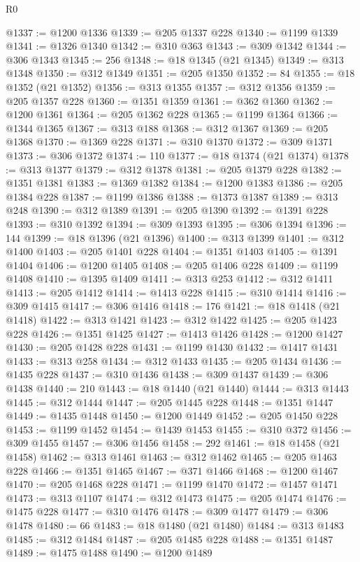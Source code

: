 \begin{lexlean}{R0}
\begin{coremodule}
@1337 := @1200 @1336
@1339 := @205 @1337 @228
@1340 := @1199 @1339
@1341 := @1326 @1340
@1342 := @310 @363
@1343 := @309 @1342
@1344 := @306 @1343
@1345 := 256
@1348 := @18 @1345 (@21 @1345)
@1349 := @313 @1348
@1350 := @312 @1349
@1351 := @205 @1350
@1352 := 84
@1355 := @18 @1352 (@21 @1352)
@1356 := @313 @1355
@1357 := @312 @1356
@1359 := @205 @1357 @228
@1360 := @1351 @1359
@1361 := @362 @1360
@1362 := @1200 @1361
@1364 := @205 @1362 @228
@1365 := @1199 @1364
@1366 := @1344 @1365
@1367 := @313 @188
@1368 := @312 @1367
@1369 := @205 @1368
@1370 := @1369 @228
@1371 := @310 @1370
@1372 := @309 @1371
@1373 := @306 @1372
@1374 := 110
@1377 := @18 @1374 (@21 @1374)
@1378 := @313 @1377
@1379 := @312 @1378
@1381 := @205 @1379 @228
@1382 := @1351 @1381
@1383 := @1369 @1382
@1384 := @1200 @1383
@1386 := @205 @1384 @228
@1387 := @1199 @1386
@1388 := @1373 @1387
@1389 := @313 @248
@1390 := @312 @1389
@1391 := @205 @1390
@1392 := @1391 @228
@1393 := @310 @1392
@1394 := @309 @1393
@1395 := @306 @1394
@1396 := 144
@1399 := @18 @1396 (@21 @1396)
@1400 := @313 @1399
@1401 := @312 @1400
@1403 := @205 @1401 @228
@1404 := @1351 @1403
@1405 := @1391 @1404
@1406 := @1200 @1405
@1408 := @205 @1406 @228
@1409 := @1199 @1408
@1410 := @1395 @1409
@1411 := @313 @253
@1412 := @312 @1411
@1413 := @205 @1412
@1414 := @1413 @228
@1415 := @310 @1414
@1416 := @309 @1415
@1417 := @306 @1416
@1418 := 176
@1421 := @18 @1418 (@21 @1418)
@1422 := @313 @1421
@1423 := @312 @1422
@1425 := @205 @1423 @228
@1426 := @1351 @1425
@1427 := @1413 @1426
@1428 := @1200 @1427
@1430 := @205 @1428 @228
@1431 := @1199 @1430
@1432 := @1417 @1431
@1433 := @313 @258
@1434 := @312 @1433
@1435 := @205 @1434
@1436 := @1435 @228
@1437 := @310 @1436
@1438 := @309 @1437
@1439 := @306 @1438
@1440 := 210
@1443 := @18 @1440 (@21 @1440)
@1444 := @313 @1443
@1445 := @312 @1444
@1447 := @205 @1445 @228
@1448 := @1351 @1447
@1449 := @1435 @1448
@1450 := @1200 @1449
@1452 := @205 @1450 @228
@1453 := @1199 @1452
@1454 := @1439 @1453
@1455 := @310 @372
@1456 := @309 @1455
@1457 := @306 @1456
@1458 := 292
@1461 := @18 @1458 (@21 @1458)
@1462 := @313 @1461
@1463 := @312 @1462
@1465 := @205 @1463 @228
@1466 := @1351 @1465
@1467 := @371 @1466
@1468 := @1200 @1467
@1470 := @205 @1468 @228
@1471 := @1199 @1470
@1472 := @1457 @1471
@1473 := @313 @1107
@1474 := @312 @1473
@1475 := @205 @1474
@1476 := @1475 @228
@1477 := @310 @1476
@1478 := @309 @1477
@1479 := @306 @1478
@1480 := 66
@1483 := @18 @1480 (@21 @1480)
@1484 := @313 @1483
@1485 := @312 @1484
@1487 := @205 @1485 @228
@1488 := @1351 @1487
@1489 := @1475 @1488
@1490 := @1200 @1489

\end{coremodule}
\end{lexlean}

